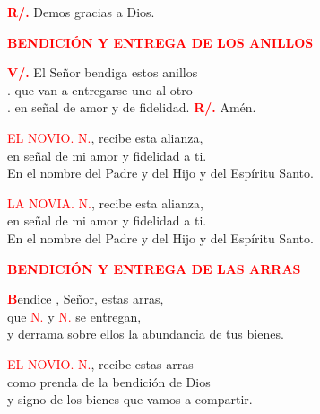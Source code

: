 \documentclass[12pt, letterpaper, spanish]{report}
\begin{document}
\Large \hspace{-0.9cm} {\bfseries \textcolor{red}{R/.}} \hspace{0.5cm} Demos gracias a Dios. \newline

\Large {\bfseries \textcolor{red}{BENDICI\'ON Y ENTREGA DE LOS ANILLOS}} \newline

\Large \hspace{-0.9cm} {\bfseries \textcolor{red}{V/.}} \hspace{0.5cm} El Se\~nor bendiga \Huge \textcolor{red}{} \Large estos anillos \\
.\hspace{1.5cm} que van a entregarse uno al otro \\
.\hspace{1.5cm} en se\~nal de amor y de fidelidad. \newline
\Large {\bfseries \textcolor{red}{R/.}} \hspace{0.5cm}  Am\'en. \newline

\textcolor{red}{EL NOVIO.} \newline
\textcolor{red}{N.}, recibe esta alianza, \\
en se\~nal de mi amor y fidelidad a ti. \\
En el nombre del Padre y del Hijo y del Esp\'iritu Santo. \newline

\textcolor{red}{LA NOVIA.} \newline
\textcolor{red}{N.}, recibe esta alianza, \\
en se\~nal de mi amor y fidelidad a ti. \\
En el nombre del Padre y del Hijo y del Esp\'iritu Santo. \newline

\Large {\bfseries \textcolor{red}{BENDICI\'ON Y ENTREGA DE LAS ARRAS}} \newline

\lettrine{\bfseries \textcolor{red}{B}}{}endice \Huge \textcolor{red}{},  \Large Se\~nor, estas arras, \\
que \textcolor{red}{N.} y \textcolor{red}{N.} se entregan, \\
y derrama sobre ellos la abundancia de tus bienes. \newline

\textcolor{red}{EL NOVIO.} \newline
\textcolor{red}{N.}, recibe estas arras \\
como prenda de la bendici\'on de Dios \\
y signo de los bienes que vamos a compartir. \newline
\end{document}
